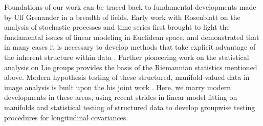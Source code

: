 Foundations of our work can be traced back to fundamental developments made by Ulf Grenander in a breadth of fields. Early work with Rosenblatt on the analysis of stochastic processes and time series first brought to light
the fundamental issues of linear modeling in Euclidean space, and demonstrated that in many cases it is necessary to develop methods that take explicit advantage of the inherent structure within data \cite{grenander1957statistical}.
Further pioneering work on the statistical analysis on Lie groups \cite{grenander2008probabilities} provides the basis of the Riemannian statistics mentioned above.
Modern hypothesis testing of these structured, manifold-valued data in image analysis is built upon the his joint work \cite{grenander1998computational}. Here, we marry modern developments in these areas, using recent strides in linear model fitting on manifolds and statistical testing of structured data to develop groupwise testing procedures for longitudinal covariances.
